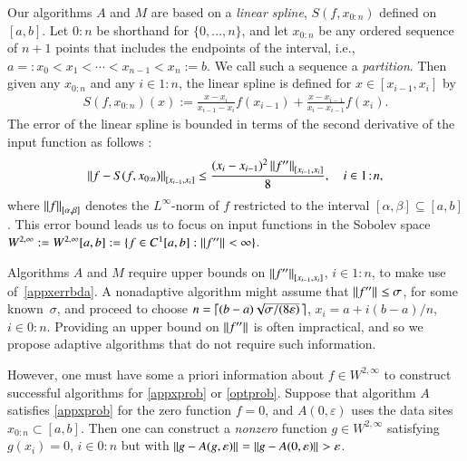 \documentclass[review]{elsarticle}
\newcommand{\abstol}{\varepsilon}
\newcommand{\zton}{0\!:\!n}
\newcommand{\oton}{1\!:\!n}
\newcommand{\datasites}{x_{0:n}}
\theoremstyle{definition}
\renewcommand{\cw}{W}
\begin{document}
Our algorithms $A$ and $M$ are based on a \emph{linear spline}, $S(f,\datasites)$ 
defined on $[a,b]$.  Let ${0\!:\!n}$ be shorthand for $\{0, \ldots, n\}$, and let 
$\datasites$ be any
ordered sequence of $n+1$ points that includes the endpoints of the interval,
i.e., $a=:x_0 <x_1 < \cdots < x_{n-1} < x_{n}:=b$. We call such a sequence a
\emph{partition}. Then given any $\datasites$ and any $i \in \oton$, the linear 
spline  is defined for $x \in [x_{i-1},x_i]$ by
\begin{align} \label{splinedef}
   S(f,\datasites)(x) :=
   \frac{x-x_i}{x_{i-1} - x_i} f(x_{i-1}) + \frac{x-x_{i-1}}{x_{i} - x_{i-1}}f(x_i).
\end{align}
The error of the linear spline is bounded in terms
of the second derivative of the input function as follows \cite[Theorem
3.3]{BurFaiBur16a}:
\begin{equation} \label{appxerrbda}
	\norm[{[x_{i-1},x_i]}]{f - S(f,\datasites)}
	\le \frac{(x_i - x_{i-1})^2\norm[{[x_{i-1},x_i]}]{f''}}{8}, \quad i \in \oton,
\end{equation}
where $\norm[{[\alpha,\beta]}]{f}$ denotes the $L^{\infty}$-norm of $f$ restricted to the
interval $[\alpha,\beta] \subseteq [a,b]$. This error bound leads us to focus on 
input functions in the Sobolev space $\cw^{2,\infty}:= \cw^{2,\infty}[a,b] := \{f \in 
C^1[a,b] : \norm{f''} < \infty \}$.

Algorithms $A$ and $M$ require upper bounds on $\norm[{[x_{i-1},x_i]}]{f''}$, $i \in
1\!:\!n$,
to make use of~\eqref{appxerrbda}. A nonadaptive algorithm might assume that
$\norm{f''} \le \sigma$, for some known~$\sigma$, and proceed to choose $n =
\bigl \lceil (b-a)\smash{\sqrt{\sigma/(8 \varepsilon)}} \, \bigr \rceil$, $x_i = a +
i(b-a)/n$, $i \in 0\!:\!n$. Providing an upper bound on $\norm{f''}$ is
often impractical, and so we propose adaptive algorithms that do not
require such information.

However, one must have some a priori information about $f \in \cw^{2,\infty}$
to construct successful algorithms for \eqref{appxprob} or \eqref{optprob}.
Suppose that algorithm $A$ satisfies \eqref{appxprob} for the zero function $f=0$, and
$A(0,\varepsilon)$ uses the data sites $x_{0:n}\subset [a,b]$. Then one can
construct a \emph{nonzero} function $g \in \cw^{2,\infty}$ satisfying $g(x_i) =
0$, $i\in \zton$ but with $\smash{\norm{g- A(g,\abstol)}} = \smash{\norm{g -
A(0,\abstol)}} > \varepsilon$.
\end{document}
